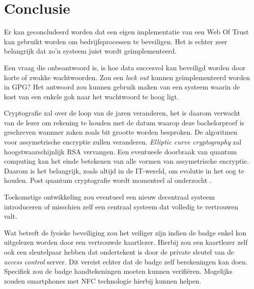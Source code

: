 
\chapter{Conclusie}
\label{ch:conclusie}


Er kan geconcludeerd worden dat een eigen implementatie van een Web Of Trust kan gebruikt worden om bedrijfsprocessen te beveiligen. Het is echter zeer belangrijk dat zo'n systeem juist wordt geïmplementeerd.

Een vraag die onbeantwoord is, is hoe data succesvol kan beveiligd worden door korte of zwakke wachtwoorden. Zou een \textit{lock out} kunnen geïmplementeerd worden in GPG? Het antwoord zou kunnen gebruik maken van een systeem waarin de kost van een enkele gok naar het wachtwoord te hoog ligt.

Cryptografie zal over de loop van de jaren veranderen, het is daarom verwacht van de lezer om rekening te houden met de datum waarop deze bachelorproef is geschreven wannner zaken zoals bit grootte worden besproken. De algoritmen voor assymetrische encryptie zullen veranderen. \textit{Elliptic curve cryptography} zal hoogstwaarschijnlijk RSA vervangen. Een eventueele doorbraak van quantum computing kan het einde betekenen van alle vormen van assymetrische encryptie. Daarom is het belangrijk, zoals altijd in de IT-wereld, om evolutie in het oog te houden. Post quantum cryptografie wordt momenteel al onderzocht \autocite{ANewHopeUsenix}.

Toekomstige ontwikkeling zou eventueel een nieuw decentraal systeem introduceren of misschien zelf een centraal systeem dat volledig te vertrouwen valt.

Wat betreft de fysieke beveiliging zou het veiliger zijn indien de badge enkel kon uitgelezen worden door een vertrouwde kaartlezer. Hierbij zou een kaartlezer zelf ook een sleutelpaar hebben dat ondertekent is door de private sleutel van de \textit{access control} server. Dit vereist echter dat de badge zelf berekeningen kan doen. Specifiek zou de badge handtekeningen moeten kunnen verifiëren. Mogelijks zouden smartphones met NFC technologie hierbij kunnen helpen.
